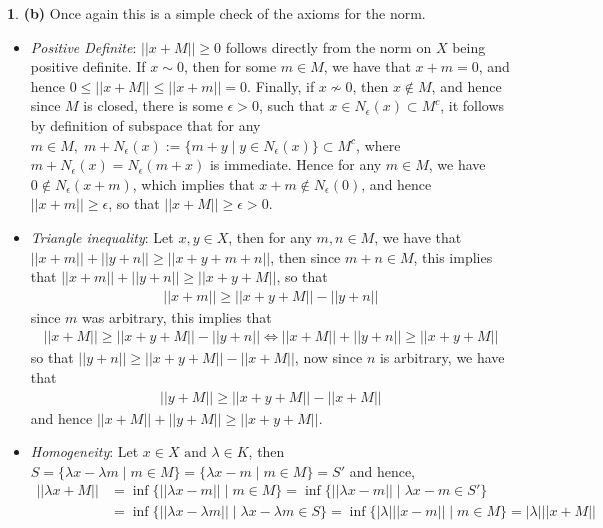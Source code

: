 \documentclass[10.5pt]{article}
\theoremstyle{definition}
\newtheorem{pb}{}
\newcommand{\set}[1]{\{#1\}}
\newcommand{\abs}[1]{\left\vert#1\right\vert}
\newcommand{\norm}[1]{\lvert\lvert#1\rvert\rvert}
\newcommand{\tand}{\text{ and }}
\begin{document}
\begin{pb}
            \textbf{(b)} Once again this is a simple check of the axioms for the norm.
            \begin{itemize}
                \item \emph{Positive Definite}: \(\norm{x + M} \geq 0\) follows directly from the norm on \(X\) being positive definite. If \(x \sim 0\), then for some \(m \in M\), we have that \(x + m = 0\), and hence \(0 \leq \norm{x + M} \leq \norm{x + m} = 0\). Finally, if \(x \not \sim 0\), then \(x \not \in M\), and hence since \(M\) is closed, there is some \(\epsilon > 0\), such that \(x \in N_\epsilon(x) \subset M^c\), it follows by definition of subspace that for any \(m \in M, \; m + N_\epsilon(x) := \set{m + y \mid y \in N_\epsilon(x)} \subset M^c\), where \(m + N_\epsilon(x) = N_\epsilon(m + x)\) is immediate. Hence for any \(m \in M\), we have \(0 \not \in N_\epsilon(x + m)\), which implies that \(x + m \not \in N_\epsilon(0)\), and hence \(\norm{x + m} \geq \epsilon\), so that \(\norm{x + M} \geq \epsilon > 0\).
                \item \emph{Triangle inequality}: Let \(x,y \in X\), then for any \(m,n \in M\), we have that
                \(\norm{x + m} + \norm{y + n} \geq \norm{x + y + m + n}\), then since \(m + n \in M\), this implies that \(\norm{x + m} + \norm{y + n} \geq \norm{x + y + M}\), so that
                \begin{align*}
                    \norm{x + m} \geq \norm{x + y + M} - \norm{y + n}
                \end{align*}
                since \(m\) was arbitrary, this implies that
                \begin{align*}
                    \norm{x + M} \geq \norm{x + y + M} - \norm{y + n} \iff \norm{x + M} + \norm{y + n} \geq \norm{x + y + M}
                \end{align*}
                so that \(\norm{y + n} \geq \norm{x + y + M} - \norm{x + M}\), now since \(n\) is arbitrary, we have that
                \begin{align*}
                    \norm{y + M} \geq \norm{x + y + M} - \norm{x + M}
                \end{align*}
                and hence \(\norm{x + M} + \norm{y + M} \geq \norm{x + y + M}\).
                \item \emph{Homogeneity}: Let \(x \in X \tand \lambda \in K\), then \(S = \set{\lambda x - \lambda m \mid m \in M} = \set{\lambda x - m \mid m \in M} = S'\) and hence,
                \begin{align*}
                    \norm{\lambda x + M} &= \inf\set{\norm{\lambda x - m} \mid m \in M} = \inf\set{\norm{\lambda x - m} \mid \lambda x - m \in S'} \\ 
                    &= \inf\set{\norm{\lambda x - \lambda m} \mid \lambda x - \lambda m \in S} = \inf\set{\abs{\lambda}\norm{x - m} \mid m \in M} = \abs{\lambda}\norm{x + M}
                \end{align*}
            \end{itemize}


\end{pb}
\end{document}
